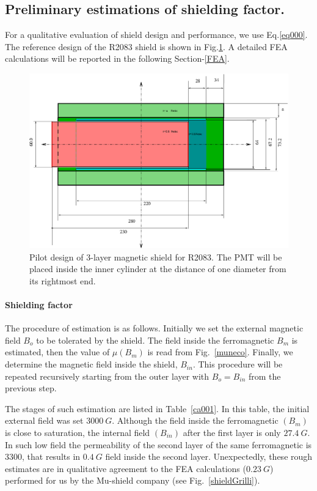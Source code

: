 \documentclass[12pt]{article}
\begin{document}
\subsection{Preliminary estimations of shielding factor.}
For a qualitative  evaluation of  
shield design  and performance,  we  use Eq.\ref{eq000}.
The reference   design  of the  R2083 shield is shown in Fig.\ref{VBT3CY}.
A detailed FEA calculations will be  reported in the following  Section-\ref{FEA}.
\begin{figure}[htbp]
\centering
\includegraphics[width=.5\textwidth]{R2083-3000-ph.eps}
\caption{\small{Pilot design of  3-layer  magnetic shield for R2083. 
The  PMT  will be placed  inside the inner cylinder 
 at the distance of one diameter from its rightmost end.}}
\label{VBT3CY}
\end{figure}
\paragraph{Shielding factor}
The procedure of estimation is as follows.
Initially we set the external magnetic field $B_o$ to be 
tolerated by the shield.
The field inside the ferromagnetic $B_m$ is estimated, then the value of $\mu(B_m)$ is read from Fig.~\ref{muneco}. 
Finally,  we  determine the magnetic field inside the shield, $B_{in}$.
This  procedure will be repeated recursively starting from the outer layer 
with  $B_o=B_{in}$ from the previous step.

The stages of such estimation are listed in Table~\ref{ca001}.
In this table, the initial external field was  set $3000~G$.
Although the field inside the ferromagnetic $(B_m)$ is close to saturation,
the internal field $(B_{in})$ after the first layer is only $27.4~G$. 
In such low field the permeability of the second layer of the same ferromagnetic 
is 3300, that results in $0.4~G$ field inside the second layer. 
Unexpectedly, these rough estimates are in qualitative agreement to the FEA
calculations ($0.23~G$) performed for us by the Mu-shield company (see Fig.~\ref{shieldGrilli}).
%
\end{document}
